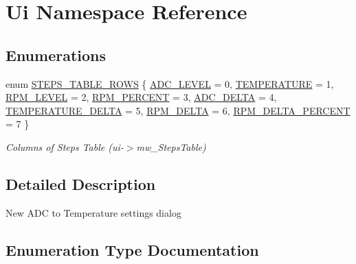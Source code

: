 \hypertarget{namespace_ui}{}\section{Ui Namespace Reference}
\label{namespace_ui}
\subsection*{Enumerations}
\begin{DoxyCompactItemize}
\item 
enum \hyperlink{namespace_ui_ab417c7821a7da9a52d574ee5e2ecf6f0}{S\+T\+E\+P\+S\+\_\+\+T\+A\+B\+L\+E\+\_\+\+R\+O\+WS} \{ \newline
\hyperlink{namespace_ui_ab417c7821a7da9a52d574ee5e2ecf6f0a3ce827b16c92c4223079c8f5e81ae264}{A\+D\+C\+\_\+\+L\+E\+V\+EL} = 0, 
\hyperlink{namespace_ui_ab417c7821a7da9a52d574ee5e2ecf6f0a95e4957d31702a84bca284e48318efd1}{T\+E\+M\+P\+E\+R\+A\+T\+U\+RE} = 1, 
\hyperlink{namespace_ui_ab417c7821a7da9a52d574ee5e2ecf6f0ac6f609b55b214ac58aa0b2f702a3244f}{R\+P\+M\+\_\+\+L\+E\+V\+EL} = 2, 
\hyperlink{namespace_ui_ab417c7821a7da9a52d574ee5e2ecf6f0a25e4220b0ee49ef66eb7c76fae978aa6}{R\+P\+M\+\_\+\+P\+E\+R\+C\+E\+NT} = 3, 
\newline
\hyperlink{namespace_ui_ab417c7821a7da9a52d574ee5e2ecf6f0aa34e92bd0beb0f4723495c66ce9c676e}{A\+D\+C\+\_\+\+D\+E\+L\+TA} = 4, 
\hyperlink{namespace_ui_ab417c7821a7da9a52d574ee5e2ecf6f0a7d1306709fbe1b5d00d6792f3a1e9ae1}{T\+E\+M\+P\+E\+R\+A\+T\+U\+R\+E\+\_\+\+D\+E\+L\+TA} = 5, 
\hyperlink{namespace_ui_ab417c7821a7da9a52d574ee5e2ecf6f0aa810bf7a4e77e6c834b2bf7f956429ac}{R\+P\+M\+\_\+\+D\+E\+L\+TA} = 6, 
\hyperlink{namespace_ui_ab417c7821a7da9a52d574ee5e2ecf6f0af4e0e9ab0dbab7f2cad423ad7f315d1b}{R\+P\+M\+\_\+\+D\+E\+L\+T\+A\+\_\+\+P\+E\+R\+C\+E\+NT} = 7
 \}\begin{DoxyCompactList}\small\item\em Columns of Steps Table (ui-\/$>$mw\+\_\+\+Steps\+Table) \end{DoxyCompactList}
\end{DoxyCompactItemize}


\subsection{Detailed Description}
New A\+DC to Temperature settings dialog 

\subsection{Enumeration Type Documentation}
\mbox{\label{namespace_ui_ab417c7821a7da9a52d574ee5e2ecf6f0}} 
